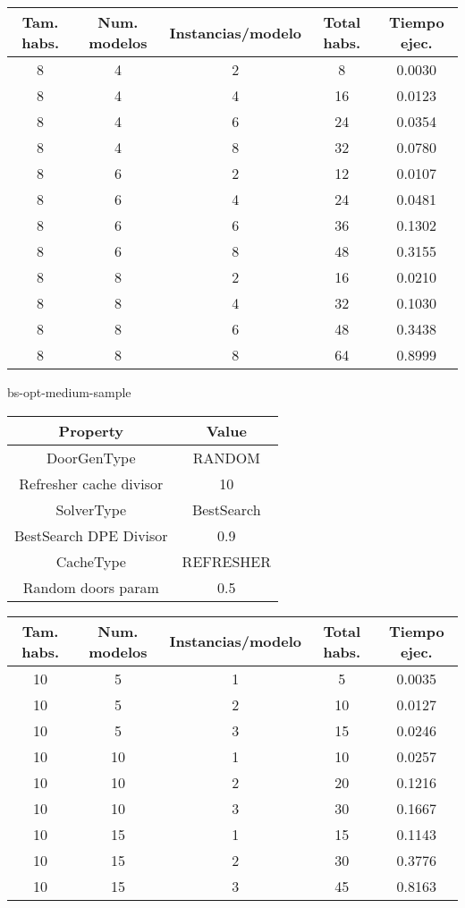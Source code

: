 \begin{center}
	\begin{tabular}{ | c | c | c | c | c | }
\hline
Tam. habs. & Num. modelos & Instancias/modelo & Total habs. & Tiempo ejec. \\ \hline 
8 & 4 & 2 & 8 & 0.0030 \\ 
8 & 4 & 4 & 16 & 0.0123 \\ 
8 & 4 & 6 & 24 & 0.0354 \\ 
8 & 4 & 8 & 32 & 0.0780 \\ 
8 & 6 & 2 & 12 & 0.0107 \\ 
8 & 6 & 4 & 24 & 0.0481 \\ 
8 & 6 & 6 & 36 & 0.1302 \\ 
8 & 6 & 8 & 48 & 0.3155 \\ 
8 & 8 & 2 & 16 & 0.0210 \\ 
8 & 8 & 4 & 32 & 0.1030 \\ 
8 & 8 & 6 & 48 & 0.3438 \\ 
8 & 8 & 8 & 64 & 0.8999 \\ 
\hline
	\end{tabular}
\end{center}

bs-opt-medium-sample
\begin{center}
	\begin{tabular}{ | c | c | }
\hline
 		Property & Value \\ \hline
DoorGenType & RANDOM \\ 
Refresher cache divisor & 10 \\ 
SolverType & BestSearch \\ 
BestSearch DPE Divisor & 0.9 \\ 
CacheType & REFRESHER \\ 
Random doors param & 0.5 \\ 
\hline
	\end{tabular}
\end{center}

\begin{center}
	\begin{tabular}{ | c | c | c | c | c | }
\hline
Tam. habs. & Num. modelos & Instancias/modelo & Total habs. & Tiempo ejec. \\ \hline 
10 & 5 & 1 & 5 & 0.0035 \\ 
10 & 5 & 2 & 10 & 0.0127 \\ 
10 & 5 & 3 & 15 & 0.0246 \\ 
10 & 10 & 1 & 10 & 0.0257 \\ 
10 & 10 & 2 & 20 & 0.1216 \\ 
10 & 10 & 3 & 30 & 0.1667 \\ 
10 & 15 & 1 & 15 & 0.1143 \\ 
10 & 15 & 2 & 30 & 0.3776 \\ 
10 & 15 & 3 & 45 & 0.8163 \\ 
\hline
	\end{tabular}
\end{center}

